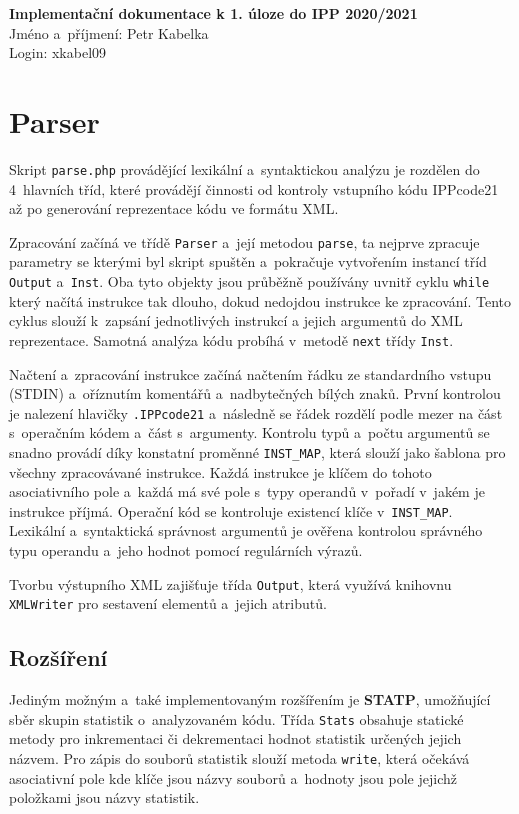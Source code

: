 \documentclass[10pt,a4paper]{article}
\begin{document}
    {\noindent\sffamily\large
        \textbf{Implementační dokumentace k 1. úloze do IPP 2020/2021} \\
        Jméno a~příjmení: Petr Kabelka \\
        Login: xkabel09
    }

    \section{Parser}

    Skript \texttt{parse.php} provádějící lexikální a~syntaktickou analýzu je
    rozdělen do 4~hlavních tříd, které provádějí činnosti od kontroly vstupního
    kódu IPPcode21 až po generování reprezentace kódu ve formátu XML.

    Zpracování začíná ve třídě \texttt{Parser} a~její metodou \texttt{parse}, ta
    nejprve zpracuje parametry se kterými byl skript spuštěn a~pokračuje
    vytvořením instancí tříd \texttt{Output} a~\texttt{Inst}. Oba tyto objekty
    jsou průběžně používány uvnitř cyklu \texttt{while} který načítá instrukce
    tak dlouho, dokud nedojdou instrukce ke zpracování. Tento cyklus slouží
    k~zapsání jednotlivých instrukcí a jejich argumentů do XML reprezentace.
    Samotná analýza kódu probíhá v~metodě \texttt{next} třídy \texttt{Inst}.

    Načtení a~zpracování instrukce začíná načtením řádku ze standardního vstupu
    (STDIN) a~oříznutím komentářů a~nadbytečných bílých znaků. První kontrolou
    je nalezení hlavičky \texttt{.IPPcode21} a~následně se řádek rozdělí podle
    mezer na část s~operačním kódem a~část s~argumenty. Kontrolu typů
    a~počtu argumentů se snadno provádí díky konstatní proměnné
    \texttt{INST\_MAP}, která slouží jako šablona pro všechny zpracovávané
    instrukce. Každá instrukce je klíčem do tohoto asociativního pole a~každá
    má své pole s~typy operandů v~pořadí v~jakém je instrukce příjmá. Operační
    kód se kontroluje existencí klíče v~\texttt{INST\_MAP}. Lexikální
    a~syntaktická správnost argumentů je ověřena kontrolou správného typu
    operandu a~jeho hodnot pomocí regulárních výrazů.

    Tvorbu výstupního XML zajišťuje třída \texttt{Output}, která využívá
    knihovnu \texttt{XMLWriter} pro sestavení elementů a~jejich atributů.

    \subsection{Rozšíření}

    Jediným možným a~také implementovaným rozšířením je \textbf{STATP},
    umožňující sběr skupin statistik o~analyzovaném kódu. Třída \texttt{Stats}
    obsahuje statické metody pro inkrementaci či dekrementaci hodnot statistik
    určených jejich názvem. Pro zápis do souborů statistik slouží metoda
    \texttt{write}, která očekává asociativní pole kde klíče jsou názvy souborů
    a~hodnoty jsou pole jejichž položkami jsou názvy statistik.
\end{document}
